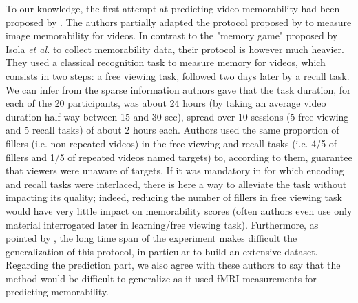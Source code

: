 \documentclass[sigconf]{acmart}
\begin{document}
To our knowledge, the first attempt at predicting video memorability had been proposed by \cite{han_2015_learning}. 
The authors partially adapted the protocol proposed by \cite{isola_2011_makes} to measure image memorability for videos.
In contrast to the "memory game" proposed by Isola \textit{et al.} to collect memorability data, their protocol is however much heavier. 
They used a classical recognition task to measure memory for videos, which consists in two steps: a free viewing task, followed two days later by a recall task.
We can infer from the sparse information authors gave that the task duration, for each of the 20 participants, was about 24 hours (by taking an average video duration half-way between 15 and 30 sec), spread over 10 sessions (5 free viewing and 5 recall tasks) of about 2 hours each.
Authors used the same proportion of fillers (i.e. non repeated videos) in the free viewing and recall tasks (i.e. 4/5 of fillers and 1/5 of repeated videos named targets) to, according to them, guarantee that viewers were unaware of targets.
If it was mandatory in \cite{isola_2011_makes} for which encoding and recall tasks were interlaced, there is here a way to alleviate the task without impacting its quality; indeed, reducing the number of fillers in free viewing task would have very little impact on memorability scores (often authors even use only material interrogated later in learning/free viewing task).
Furthermore, as pointed by \cite{shekhar_2017_show}, the long time span of the experiment makes difficult the generalization of this protocol, in particular to build an extensive dataset. Regarding the prediction part, we also agree with these authors to say that the method would be difficult to generalize as it used fMRI measurements for predicting memorability.
\end{document}
